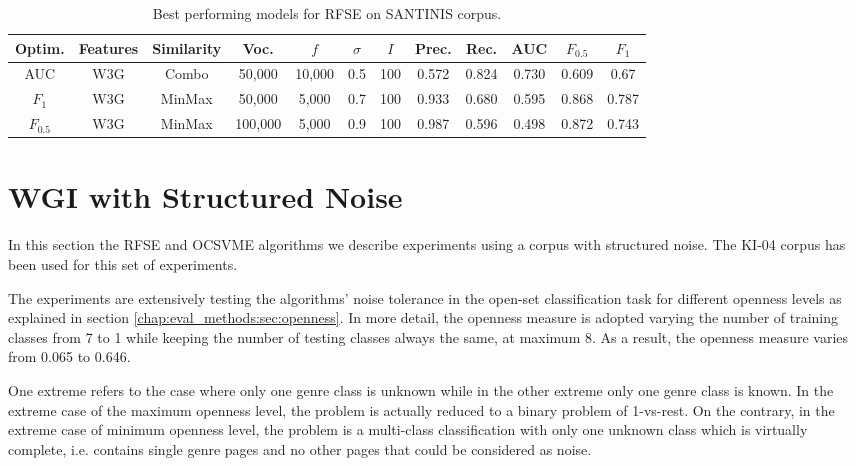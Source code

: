 \begin{table}[t]
\center
\caption{Best performing models for RFSE on SANTINIS corpus.}\label{chap:noise:tbl:RFSE_SANTINIS}
\begin{adjustbox}{width=\textwidth}
\begin{tabular}{|c c c c c c c c c c c c|}
	\hline
	Optim. & Features & Similarity & Voc. & $f$ & $\sigma$ & $I$ & Prec. & Rec. & AUC & $F_{0.5}$ & $F_{1}$ \\
	\hline
	AUC & W3G & Combo & 50,000 & 10,000 & 0.5 & 100 & 0.572 & 0.824 & 0.730 & 0.609 & 0.67\\
	$F_{1}$ & W3G & MinMax & 50,000 & 5,000 & 0.7 & 100 & 0.933 & 0.680 & 0.595  & 0.868 & 0.787\\
	$F_{0.5}$ & W3G & MinMax & 100,000 & 5,000 & 0.9 & 100 & 0.987 & 0.596 & 0.498 & 0.872 & 0.743\\
	\hline
\end{tabular}

\end{adjustbox}	

\end{table}


\section{WGI with Structured Noise}
\label{chap:noise:sec:openness_evaluation}

In this section the RFSE and OCSVME algorithms we describe experiments using a corpus with structured noise. The KI-04 corpus has been used for this set of experiments. 

The experiments are extensively testing the algorithms' noise tolerance in the open-set classification task for different openness levels as explained in section \ref{chap:eval_methods:sec:openness}. In more detail, the openness measure is adopted varying the number of training classes from 7 to 1 while keeping the number of testing classes always the same, at maximum 8. As a result, the openness measure varies from 0.065 to 0.646. 

One extreme refers to the case where only one genre class is unknown while in the other extreme only one genre class is known. In the extreme case of the maximum openness level, the problem is actually reduced to a binary problem of 1-vs-rest. On the contrary, in the extreme case of minimum openness level, the problem is a multi-class classification with only one unknown class which is virtually complete, i.e. contains single genre pages and no other pages that could be considered as noise.

